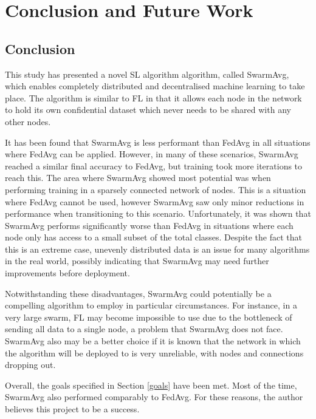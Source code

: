 \chapter{Conclusion and Future Work}
\section{Conclusion}


This study has presented a novel SL algorithm algorithm, called SwarmAvg, which enables completely distributed and decentralised machine learning to take place. The algorithm is similar to FL in that it allows each node in the network to hold its own confidential dataset which never needs to be shared with any other nodes.

It has been found that SwarmAvg is less performant than FedAvg in all situations where FedAvg can be applied. However, in many of these scenarios, SwarmAvg reached a similar final accuracy to FedAvg, but training took more iterations to reach this. The area where SwarmAvg showed most potential was when performing training in a sparsely connected network of nodes. This is a situation where FedAvg cannot be used, however SwarmAvg saw only minor reductions in performance when transitioning to this scenario. Unfortunately, it was shown that SwarmAvg performs significantly worse than FedAvg in situations where each node only has access to a small subset of the total classes. Despite the fact that this is an extreme case, unevenly distributed data is an issue for many algorithms in the real world, possibly indicating that SwarmAvg may need further improvements before deployment.

Notwithstanding these disadvantages, SwarmAvg could potentially be a compelling algorithm to employ in particular circumstances. For instance, in a very large swarm, FL may become impossible to use due to the bottleneck of sending all data to a single node, a problem that SwarmAvg does not face. SwarmAvg also may be a better choice if it is known that the network in which the algorithm will be deployed to is very unreliable, with nodes and connections dropping out.

Overall, the goals specified in Section \ref{goals} have been met. Most of the time, SwarmAvg also performed comparably to FedAvg. For these reasons, the author believes this project to be a success.

